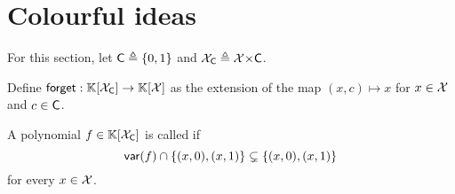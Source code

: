 %
\section{Colourful ideas}
%
For this section, let $\mathsf{C} \triangleq \{0,1\}$ and $\mathcal{X}_{\mathsf{C}} \triangleq \mathcal{X}{\times}\mathsf{C}$.
%
\begin{definition}
Define $\mathsf{forget} : \mathbb{K}[\mathcal{X}_{\mathsf{C}}] \to \mathbb{K}[\mathcal{X}]$ as the extension of the map $(x,c) \mapsto x$ for $x\in\mathcal{X}$ and $c\in\mathsf{C}$.
\end{definition}
%
\begin{definition}
A polynomial $f\in\mathbb{K}[\mathcal{X}_{\mathsf{C}}]$ is called  if
\[
\mathop{\mathsf{var}}(f) \cap \{(x,0),(x,1)\} \subsetneq \{(x,0),(x,1)\}
\]
for every $x\in\mathcal{X}$.
\end{definition}
%